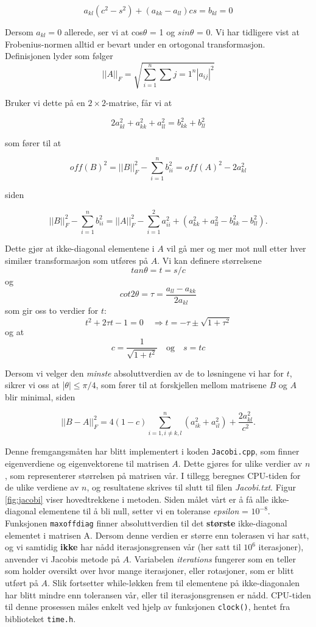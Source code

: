 \documentclass{article}
\begin{document}
\[a_{kl}(c^2 - s^2) + (a_{kk} - a_{ll})cs = b_{kl} = 0 \]

Dersom $a_{kl} = 0$ allerede, ser vi at cos$\theta$ = 1 og $sin\theta$ = 0. Vi har tidligere vist at Frobenius-normen alltid er bevart under en ortogonal transformasjon. Definisjonen lyder som følger
\begin{equation}
|| A ||_F = \sqrt{\sum_{i=1}^n \sum{j=1}^n |a_{ij}|^2 }
\end{equation}

Bruker vi dette på en $2\times 2$-matrise, får vi at 

\[2a_{kl}^2 + a_{kk}^2 + a_{ll}^2 = b_{kk}^2 + b_{ll}^2 \]

som fører til at

\[off(B)^2 = || B ||_F^2 - \sum_{i=1}^n b_{ii}^2 = off(A)^2 - 2a_{kl}^2 \]

siden

\[ || B ||_F^2 - \sum_{i=1}^n b_{ii}^2 = || A ||_F^2 - \sum_{i=1}^2a_{ii}^2 + (a_{kk}^2 + a_{ll}^2 - b_{kk}^2 - b_{ll}^2).  \]

Dette gjør at ikke-diagonal elementene i $A$ vil gå mer og mer mot null etter hver similær transformasjon som utføres på $A$. Vi kan definere størrelsene 
\[tan\theta = t = s/c \]
og
\[cot2\theta = \tau = \frac{a_{ll} - a_{kk}}{2a_{kl}} \]
som gir oss to verdier for $t$:
\[t^2 + 2\tau t - 1 = 0 \quad \Rightarrow t = -\tau \pm \sqrt{1 + \tau^2}  \]
og at
\[ c = \frac{1}{\sqrt{1 + t^2}} \quad \textrm{og} \quad s = tc \]

Dersom vi velger den \textit{minste} absoluttverdien av de to løsningene vi har for $t$, sikrer vi oss at |$\theta | \le \pi /4$, som fører til at forskjellen mellom matrisene $B$ og $A$ blir minimal, siden

\[||B - A||_F^2 = 4(1-c) \sum_{i=1, i\neq k,l}^n (a_{ik}^2 + a_{il}^2) + \frac{2a_{kl}^2}{c^2}. \]

Denne fremgangsmåten har blitt implementert i koden \texttt{Jacobi.cpp}, som finner eigenverdiene og eigenvektorene til matrisen $A$. Dette gjøres for ulike verdier av $n$, som representerer størrelsen på matrisen vår. I tillegg beregnes CPU-tiden for de ulike verdiene av $n$, og resultatene skrives til slutt til filen \textit{Jacobi.txt}. Figur \ref{fig:jacobi} viser hovedtrekkene i metoden. Siden målet vårt er å få alle ikke-diagonal elementene til å bli null, setter vi en toleranse \textit{epsilon} = $10^{-8}$. Funksjonen \texttt{maxoffdiag} finner absoluttverdien til det \textbf{største} ikke-diagonal elementet i matrisen A. Dersom denne verdien er større enn tolerasen vi har satt, og vi samtidig \textbf{ikke} har nådd iterasjonsgrensen vår (her satt til $10^6$ iterasjoner), anvender vi Jacobis metode på $A$. Variabelen \textit{iterations} fungerer som en teller som holder oversikt over hvor mange iterasjoner, eller rotasjoner, som er blitt utført på $A$. Slik fortsetter while-løkken frem til elementene på ikke-diagonalen har blitt mindre enn toleransen vår, eller til iterasjonsgrensen er nådd. CPU-tiden til denne prosessen måles enkelt ved hjelp av funksjonen \texttt{clock()}, hentet fra biblioteket \texttt{time.h}.
\end{document}
